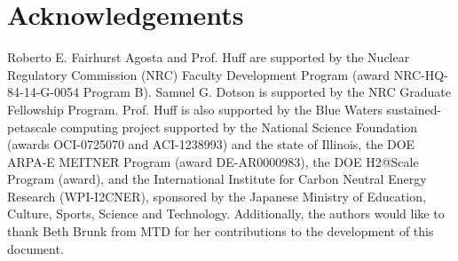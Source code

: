 \documentclass{anstrans}
\begin{document}
\section{Acknowledgements}

Roberto E. Fairhurst Agosta and Prof. Huff are supported by the Nuclear Regulatory Commission (NRC) Faculty Development Program (award NRC-HQ-84-14-G-0054 Program B). Samuel G. Dotson is supported by the NRC Graduate Fellowship Program. Prof. Huff is also supported by the Blue Waters sustained-petascale computing project supported by the National Science Foundation (awards OCI-0725070 and ACI-1238993) and the state of Illinois, the DOE ARPA-E MEITNER Program (award DE-AR0000983), the DOE H2@Scale Program (award), and the International Institute for Carbon Neutral Energy Research (WPI-I2CNER), sponsored by the Japanese Ministry of Education, Culture, Sports, Science and Technology.
Additionally, the authors would like to thank Beth Brunk from MTD for her contributions to the development of this document.



\end{document}
